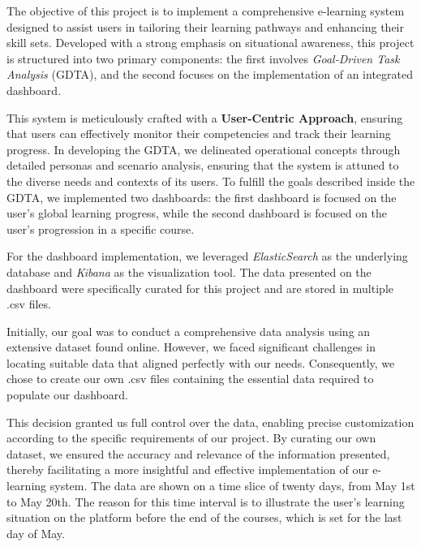 The objective of this project is to implement a comprehensive e-learning system designed to assist users 
in tailoring their learning pathways and enhancing their skill sets. Developed with a strong emphasis on 
situational awareness, this project is structured into two primary components: the first involves 
\textit{Goal-Driven Task Analysis} (GDTA), and the second focuses on the implementation of an integrated dashboard.

This system is meticulously crafted with a \textbf{User-Centric Approach}, ensuring that users can effectively 
monitor their competencies and track their learning progress. In developing the GDTA, we delineated operational 
concepts through detailed personas and scenario analysis, ensuring that the system is attuned to the diverse needs 
and contexts of its users. To fulfill the goals described inside the GDTA, we implemented two dashboards: the first
dashboard is focused on the user's global learning progress, while the second dashboard is focused on the user's
progression in a specific course.

For the dashboard implementation, we leveraged \textit{ElasticSearch} as the underlying database and \textit{Kibana} 
as the visualization tool. The data presented on the dashboard were specifically curated for this project and are 
stored in multiple .csv files. 

Initially, our goal was to conduct a comprehensive data analysis using an extensive dataset found online. However, 
we faced significant challenges in locating suitable data that aligned perfectly with our needs. Consequently, we 
chose to create our own .csv files containing the essential data required to populate our dashboard. 

This decision granted us full control over the data, enabling precise customization according to the specific 
requirements of our project. By curating our own dataset, we ensured the accuracy and relevance of the information 
presented, thereby facilitating a more insightful and effective implementation of our e-learning system. The data 
are shown on a time slice of twenty days, from May 1st to May 20th. The reason for 
this time interval is to illustrate the user's learning situation on the platform before the end of the courses,
which is set for the last day of May. 

